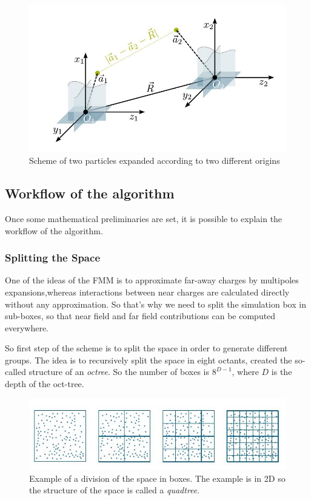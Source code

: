 \documentclass[11pt,twoside,a4paper]{report}
\begin{document}
	\begin{figure}[H]

    \includegraphics[scale=0.7]{bipolar}
    \centering 
    \caption{Scheme of two particles expanded according to two different origins}
    \label{fig:bipolar}
    \end{figure}




	
	\subsection{Workflow of the algorithm}
	
	Once some mathematical preliminaries are set, it is possible to explain the workflow of the algorithm.
	
	\subsubsection{Splitting the Space}
	
	One of the ideas of the FMM is to approximate far-away charges by multipoles expansions,whereas interactions between near charges are calculated directly without any approximation. So that's why we need to split the simulation box in sub-boxes, so that near field and far field contributions can be computed everywhere. 	
	
	So first step of the scheme is to split the space in order to generate different groups. The idea is to recursively split the space in eight octants, created the so-called structure of an \textit{octree}. So the number of boxes is $8^{D-1}$, where $D$ is the depth of the oct-tree.
	
		
	
	\begin{figure}[H]
	    
    \includegraphics[scale=0.9]{BoxDepth}    
    \centering 
    \caption{Example of a division of the space in boxes. The  example is in 2D so the structure of the space is called a \textit{quadtree}.}
    \label{fig:depth}       
     \end{figure}
	
\end{document}
